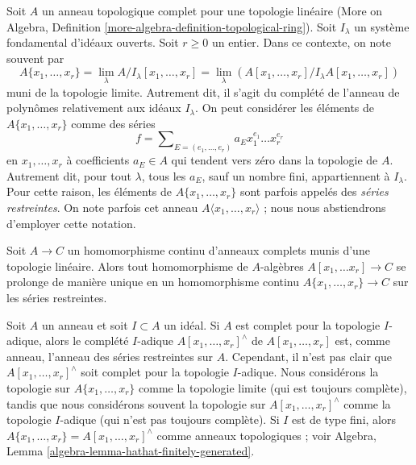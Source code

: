 \noindent
Soit $A$ un anneau topologique complet pour une
topologie linéaire (More on Algebra, Definition
\ref{more-algebra-definition-topological-ring}).
Soit $I_\lambda$ un système fondamental d'idéaux ouverts.
Soit $r \geq 0$ un entier. Dans ce contexte, on note souvent
par
$$
A\{x_1, \ldots, x_r\} =
\lim_\lambda A/I_\lambda[x_1, \ldots, x_r] =
\lim_\lambda (A[x_1, \ldots, x_r]/I_\lambda A[x_1, \ldots, x_r])
$$
muni de la topologie limite. Autrement dit, il s'agit
du complété de l'anneau de polynômes relativement aux
idéaux $I_\lambda$. On peut considérer les éléments de $A\{x_1, \ldots, x_r\}$ comme des
séries
$$
f = \sum\nolimits_{E = (e_1, \ldots, e_r)} a_E x_1^{e_1} \ldots x_r^{e_r}
$$
en $x_1, \ldots, x_r$ à coefficients $a_E \in A$ qui tendent
vers zéro dans la topologie de $A$. Autrement dit, pour tout $\lambda$,
tous les $a_E$, sauf un nombre fini, appartiennent à $I_\lambda$.
Pour cette raison, les éléments de $A\{x_1, \ldots, x_r\}$ sont parfois
appelés des {\it séries restreintes}.
On note parfois cet anneau $A\langle x_1, \ldots, x_r\rangle$ ;
nous nous abstiendrons d'employer cette notation.

\begin{remark}
\label{remark-universal-property}
\begin{reference}
\cite[Chapter 0, 7.5.3]{EGA}
\end{reference}
Soit $A \to C$ un homomorphisme continu d'anneaux complets munis d'une topologie linéaire.
Alors tout homomorphisme de $A$-algèbres $A[x_1, \ldots x_r] \to C$ se prolonge de manière unique en un
homomorphisme continu $A\{x_1, \ldots, x_r\} \to C$ sur les séries restreintes.
\end{remark}

\begin{remark}
\label{remark-I-adic-completion-and-restricted-power-series}
Soit $A$ un anneau et soit $I \subset A$ un idéal. Si $A$ est complet pour la topologie
$I$-adique, alors le complété $I$-adique $A[x_1, \ldots, x_r]^\wedge$ de
$A[x_1, \ldots, x_r]$ est, comme anneau, l'anneau des séries restreintes sur $A$.
Cependant, il n'est pas clair que $A[x_1, \ldots, x_r]^\wedge$ soit complet pour la topologie
$I$-adique. Nous considérons la topologie sur $A\{x_1, \ldots, x_r\}$
comme la topologie limite (qui est toujours complète), tandis que nous considérons souvent
la topologie sur $A[x_1, \ldots, x_r]^\wedge$ comme la topologie $I$-adique
(qui n'est pas toujours complète). Si $I$ est de type fini, alors
$A\{x_1, \ldots, x_r\} = A[x_1, \ldots, x_r]^\wedge$ comme anneaux topologiques ;
voir Algebra, Lemma \ref{algebra-lemma-hathat-finitely-generated}.
\end{remark}






